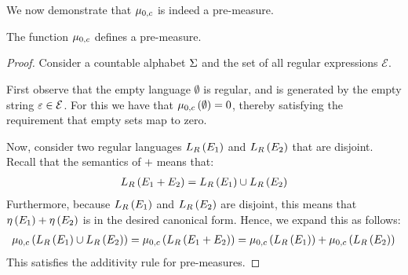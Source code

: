 We now demonstrate that \(\mu_{0, c}\) is indeed a pre-measure.

\begin{theorem}
  The function \(\mu_{0, c}\) defines a pre-measure.
\end{theorem}
\begin{proof}
  Consider a countable alphabet \(\Sigma\) and the set of all
  regular expressions \(\mathcal{E}\).

  First observe that the empty language \(\emptyset\)
  is regular,
  and is generated by the empty string \(\varepsilon \in \mathcal{E}\).
  For this we have that \(\mu_{0, c}\left(\emptyset\right) = 0\),
  thereby satisfying the requirement that empty sets map to zero.
  
  Now, consider two regular languages
  \(L_{R}\left(E_1\right)\) and \(L_{R}\left(E_2\right)\)
  that are disjoint.
  Recall that the semantics of \(+\) means that:
  \begin{align*}
    L_{R}\left(E_1 + E_2\right) =
      L_{R}\left(E_1\right) \cup L_{R}\left(E_2\right)
  \end{align*}
  Furthermore, because \(L_{R}\left(E_1\right)\) and
  \(L_{R}\left(E_2\right)\) are disjoint, this means that
  \(\eta\left(E_1\right) + \eta\left(E_2\right)\) is in
  the desired canonical form.
  Hence, we expand this as follows:
  \begin{align*}
    \mu_{0, c}
      \left(L_{R}\left(E_1\right) \cup L_{R}\left(E_2\right)\right)
      = \mu_{0, c}\left(L_{R}\left(E_1 + E_2\right)\right)
      = \mu_{0, c}\left(L_{R}\left(E_1\right)\right) +
        \mu_{0, c}\left(L_{R}\left(E_2\right)\right)
  \end{align*}
  This satisfies the additivity rule for pre-measures.
\end{proof}



